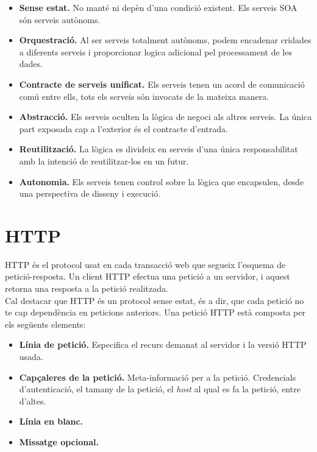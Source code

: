 \begin{itemize}
	\item \textbf{Sense estat.} No manté ni depèn d'una condició existent. Els serveis \ac{SOA} són serveis autònoms.

	\item \textbf{Orquestració.} Al ser serveis totalment autònoms, podem encadenar cridades a diferents serveis i proporcionar logica adicional pel processament de les dades.
	
	\item \textbf{Contracte de serveis unificat.} Els serveis tenen un acord de comunicació comú entre ells, tots els serveis són invocats de la mateixa manera.
	
	\item \textbf{Abstracció.} Els serveis oculten la lògica de negoci als altres serveis. La única part exposada cap a l'exterior és el contracte d'entrada.
	
	\item \textbf{Reutilització.} La lògica es divideix en serveis d'una única responsabilitat amb la intenció de reutilitzar-los en un futur.
	
	\item \textbf{Autonomia.} Els serveis tenen control sobre la lògica que encapsulen, desde una perspectiva de disseny i execució.
\end{itemize}

\section{\ac{HTTP}}\label{sec_http}

\ac{HTTP} és el protocol usat en cada transacció web que segueix l'esquema de petició-resposta. Un client \ac{HTTP} efectua una petició a un servidor, i aquest retorna una resposta a la petició realitzada.\\
\newline
Cal destacar que \ac{HTTP} és un protocol sense estat, és a dir, que cada petició no te cap dependència en peticions anteriors. Una petició \ac{HTTP} està composta per els següents elements:
\begin{itemize}
	\item \textbf{Línia de petició.} Especifica el recurs demanat al servidor i la versió \ac{HTTP} usada.
	\item \textbf{Capçaleres de la petició.} Meta-informació per a la petició. Credencials d'autenticació, el tamany de la petició, el \emph{host} al qual es fa la petició, entre d'altes.
	\item \textbf{Línia en blanc.}
	\item \textbf{Missatge opcional.}
\end{itemize}
 

